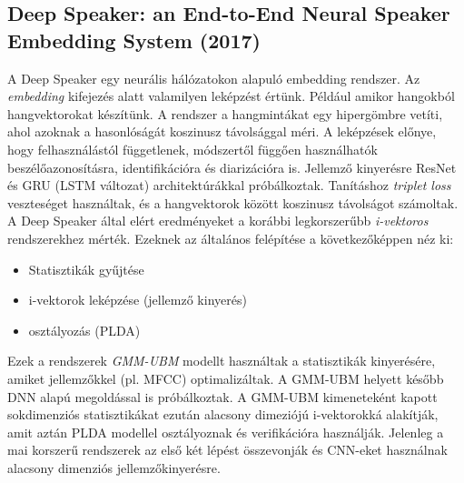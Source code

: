 \subsection{Deep Speaker: an End-to-End Neural Speaker Embedding System (2017)}

A Deep Speaker egy neurális hálózatokon alapuló embedding rendszer. Az \emph{embedding} kifejezés alatt valamilyen leképzést értünk. Például amikor hangokból hangvektorokat készítünk. A rendszer a hangmintákat egy hipergömbre vetíti, ahol azoknak a hasonlóságát koszinusz távolsággal méri.
\newline
\newline
A leképzések előnye, hogy felhasználástól függetlenek, módszertől függően használhatók beszélőazonosításra, identifikációra és diarizációra is. 
\newline
\newline
Jellemző kinyerésre ResNet és GRU (LSTM változat) architektúrákkal próbálkoztak. Tanításhoz \emph{triplet loss} veszteséget használtak, és a hangvektorok között koszinusz távolságot számoltak.
\newline
\newline
A Deep Speaker által elért eredményeket a korábbi legkorszerűbb \emph{i-vektoros} rendszerekhez mérték.
Ezeknek az általános felépítése a következőképpen néz ki:
\begin{itemize}
	\item Statisztikák gyűjtése
	\item i-vektorok leképzése (jellemző kinyerés)
	\item osztályozás (PLDA)
\end{itemize} 
Ezek a rendszerek \emph{GMM-UBM} modellt használtak a statisztikák kinyerésére, amiket jellemzőkkel (pl. MFCC) optimalizáltak. A GMM-UBM helyett később
DNN alapú megoldással is próbálkoztak. A GMM-UBM kimeneteként kapott
sokdimenziós statisztikákat ezután alacsony dimeziójú i-vektorokká alakítják, amit aztán PLDA modellel osztályoznak és verifikációra használják.
Jelenleg a mai korszerű rendszerek az első két lépést összevonják és CNN-eket használnak alacsony dimenziós jellemzőkinyerésre.
